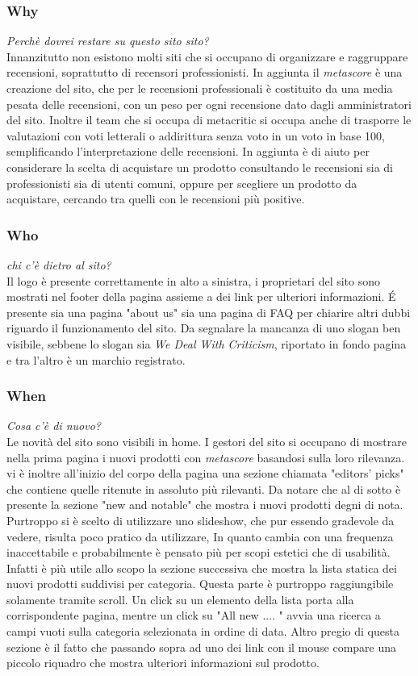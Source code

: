 \documentclass[12pt]{article}
\begin{document}
\subsubsection{Why}
\textit{Perchè dovrei restare su questo sito sito?}\\
Innanzitutto non esistono molti siti che si occupano di organizzare e raggruppare recensioni, soprattutto di recensori professionisti. In aggiunta il \textit{metascore} è una creazione del sito, che per le recensioni professionali è costituito da una media pesata delle recensioni, con un peso per ogni recensione dato dagli amministratori del sito. Inoltre il team che si occupa di metacritic si occupa anche di trasporre le valutazioni con voti letterali o addirittura senza voto in un voto in base 100, semplificando l'interpretazione delle recensioni. In aggiunta è di aiuto per considerare la scelta di acquistare un prodotto consultando le recensioni sia di professionisti sia di utenti comuni, oppure per scegliere un prodotto da acquistare, cercando tra quelli con le recensioni più positive.
\subsubsection{Who}
\textit{chi c'è dietro al sito?}\\
Il logo è presente correttamente in alto a sinistra, i proprietari del sito sono mostrati nel footer della pagina assieme a dei link per ulteriori informazioni. \'E presente sia una pagina "about us" sia una pagina di FAQ per chiarire altri dubbi riguardo il funzionamento del sito. Da segnalare la mancanza di uno slogan ben visibile, sebbene lo slogan sia \textit{We Deal With Criticism}, riportato in fondo pagina e tra l'altro è un marchio registrato.
\subsubsection{When}
\textit{Cosa c'è di nuovo?}\\
Le novità del sito sono visibili in home. I gestori del sito si occupano di mostrare nella prima pagina i nuovi prodotti con \textit{metascore} basandosi sulla loro rilevanza. vi è inoltre all'inizio del corpo della pagina una sezione chiamata "editors' picks" che contiene quelle ritenute in assoluto più rilevanti. Da notare che al di sotto è presente la sezione "new and notable" che mostra i nuovi prodotti degni di nota. Purtroppo si è scelto di utilizzare uno slideshow, che pur essendo gradevole da vedere, risulta poco pratico da utilizzare, In quanto cambia con una frequenza inaccettabile  e probabilmente è pensato più per scopi estetici che di usabilità. Infatti è più utile allo scopo la sezione successiva che mostra la lista statica dei nuovi prodotti suddivisi per categoria. Questa parte è purtroppo raggiungibile solamente tramite scroll. Un click su un elemento della lista porta alla corrispondente pagina, mentre un click su "All new .... " avvia una ricerca a campi vuoti sulla categoria selezionata in ordine di data. Altro pregio di questa sezione è il fatto che passando sopra ad uno dei link con il mouse compare una piccolo riquadro che mostra ulteriori informazioni sul prodotto.
\end{document}
